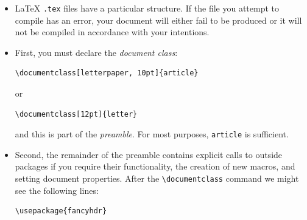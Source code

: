 \begin{itemize}

\item \LaTeX{} \texttt{.tex} files have a particular structure. If the file you
  attempt to compile has an error, your document will either fail to be produced
  or it will not be compiled in accordance with your intentions.

\item First, you must declare the \textit{document class}: \\


  \begin{center}
    \begin{minipage}{.8\linewidth}
      \begin{framed}
\begin{verbatim}
\documentclass[letterpaper, 10pt]{article}
\end{verbatim}
      \end{framed}
    \end{minipage}
  \end{center}
  or \\

  \begin{center}
    \begin{minipage}{.8\linewidth}
      \begin{framed}
\begin{verbatim}
\documentclass[12pt]{letter}
\end{verbatim}
      \end{framed}
    \end{minipage}
  \end{center}

  and this is part of the \textit{preamble}. For most purposes,
  \texttt{article} is sufficient.

\item \par Second, the remainder of the preamble contains explicit calls to
  outside packages if you require their functionality, the creation of
  new macros, and setting document properties. After the
  \texttt{\textbackslash documentclass} command we might see the
  following lines:\\

  \begin{center}
    \begin{minipage}{.8\linewidth}
      \begin{framed}
\begin{verbatim}
\usepackage{fancyhdr}


\end{verbatim}
\end{framed}
\end{minipage}
\end{center}
\end{itemize}
